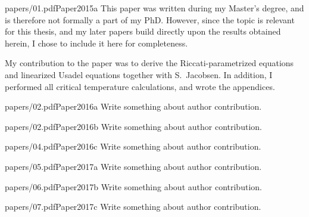 \begin{paper}{papers/01.pdf}{Paper2015a}%
  This paper was written during my Master's degree, and is therefore not formally a part of my PhD.
  However, since the topic is relevant for this thesis, and my later papers build directly upon the results obtained herein, I chose to include it here for completeness.

  My contribution to the paper was to derive the Riccati-parametrized equations and linearized Usadel equations together with S.~Jacobsen.
  In addition, I performed all critical temperature calculations, and wrote the appendices.
\end{paper}

\begin{paper}{papers/02.pdf}{Paper2016a}
  Write something about author contribution.
\end{paper}

\begin{paper}{papers/02.pdf}{Paper2016b}
  Write something about author contribution.
\end{paper}

\begin{paper}{papers/04.pdf}{Paper2016c}
  Write something about author contribution.
\end{paper}

\begin{paper}{papers/05.pdf}{Paper2017a}
  Write something about author contribution.
\end{paper}

\begin{paper}{papers/06.pdf}{Paper2017b}
  Write something about author contribution.
\end{paper}

\begin{paper}{papers/07.pdf}{Paper2017c}
  Write something about author contribution.
\end{paper}

